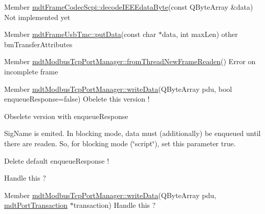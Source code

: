 \label{todo__todo000057}
\hypertarget{todo__todo000057}{}
 
\begin{DoxyDescription}
\item[Member \hyperlink{classmdt_frame_codec_scpi_ab70c6c3d2d91ddff065952b6c2db8345}{mdtFrameCodecScpi::decodeIEEEdataByte}(const QByteArray \&data) ]Not implemented yet 
\end{DoxyDescription}

\label{todo__todo000058}
\hypertarget{todo__todo000058}{}
 
\begin{DoxyDescription}
\item[Member \hyperlink{classmdt_frame_usb_tmc_a06d2743a113bd2b4cf2ee44014ecd710}{mdtFrameUsbTmc::putData}(const char $\ast$data, int maxLen) ]other bmTransferAttributes 
\end{DoxyDescription}

\label{todo__todo000019}
\hypertarget{todo__todo000019}{}
 
\begin{DoxyDescription}
\item[Member \hyperlink{classmdt_modbus_tcp_port_manager_ad941ea607f00db54aa6deb2866a539e9}{mdtModbusTcpPortManager::fromThreadNewFrameReaden}() ]Error on incomplete frame 
\end{DoxyDescription}

\label{todo__todo000020}
\hypertarget{todo__todo000020}{}
 
\begin{DoxyDescription}
\item[Member \hyperlink{classmdt_modbus_tcp_port_manager_ac83ea9c640869a4bccb4a4787697c646}{mdtModbusTcpPortManager::writeData}(QByteArray pdu, bool enqueueResponse=false) ]Obelete this version ! 

Obselete version with enqueueResponse 

SigName is emited. In blocking mode, data must (additionally) be enqueued until there are readen. So, for blocking mode (\char`\"{}script\char`\"{}), set this parameter true. 

Delete default enqueueResponse ! 

Handle this ? 
\end{DoxyDescription}

\label{todo__todo000018}
\hypertarget{todo__todo000018}{}
 
\begin{DoxyDescription}
\item[Member \hyperlink{classmdt_modbus_tcp_port_manager_a2a3ade6d3f9a6e7de47b9b089754288f}{mdtModbusTcpPortManager::writeData}(QByteArray pdu, \hyperlink{classmdt_port_transaction}{mdtPortTransaction} $\ast$transaction) ]Handle this ? 
\end{DoxyDescription}

